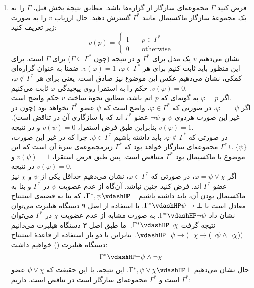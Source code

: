 \begin{ans}
\begin{enumerate}[label=(\alph*)]
        \item 
        فرض کنید $\Gamma$ مجموعه‌ای سازگار از گزاره‌ها باشد. مطابق نتیجهٔ بخش قبل، $\Gamma$ را به یک مجموعهٔ سازگار ماکسیمال مانند $\Gamma^*$ گسترش دهید. حال ارزیاب $v$ را به صورت زیر تعریف کنید:
        $$v(p) =
        \begin{cases}
            1 &\quad p \in \Gamma^*\\
            0 &\quad \text{otherwise}
        \end{cases}
        $$
        نشان می‌دهیم $v$ یک مدل برای $\Gamma^*$ و در نتیجه (چون $\Gamma \subseteq \Gamma^*$) برای $\Gamma$ است. برای این منظور باید ثابت کنیم برای هر $\varphi \in \Gamma^*$، $v(\varphi) = 1$. ضمنا به عنوان گزاره‌ای کمکی، نشان می‌دهیم عکس این موضوع نیز صادق است. یعنی برای هر $\varphi \not\in \Gamma^*$، $v(\varphi) = 0$. حکم را به استقرا روی پیچیدگی $\varphi$ ثابت می‌کنیم.\\
        اگر $\varphi = p$ به گونه‌ای که $p$ اتم باشد، مطابق نحوهٔ ساخت $v$ حکم واضح است.\\
        اگر $\varphi = \neg\psi$، در صورتی که $\varphi \in \Gamma^*$، واضح است که $\psi$ عضو $\Gamma^*$ نخواهد بود (چون در غیر این صورت هردوی $\psi$ و $\neg\psi$ عضو $\Gamma^*$ اند که با سازگاری آن در تناقض است). بنابراین طبق فرض استقرا، $v(\psi) = 0$ و در نتیجه $v(\varphi) = 1$.\\
        در صورتی که $\varphi \not\in \Gamma^*$، باید داشته باشیم $\psi \in \Gamma^*$. چرا که در غیر این صورت، $\Gamma^* \cup \{\psi\}$ مجموعه‌ای سازگار خواهد بود که $\Gamma^*$ زیرمجموعه‌ی سرهٔ آن است که این موضوع با ماکسیمال بود $\Gamma^*$ متناقض است. پس طبق فرض استقرا، $v(\psi) = 1$ و در نتیجه $v(\varphi) = 0$.\\
        اگر $\varphi = \psi \vee \chi$، در صورتی که $\varphi \in \Gamma^*$، نشان می‌دهیم حداقل یکی از $\psi$ و $\chi$ نیز عضو $\Gamma^*$ اند. فرض کنید چنین نباشد. آن‌گاه از عدم عضویت $\psi$ در $\Gamma^*$ و بنا به ماکسیمال بودن آن، باید داشته باشیم $\Gamma^*, \psi \vdashHP \bot$، که بنا به قضیه‌ی استنتاج معادل است با $\Gamma^* \vdashHP \psi\rightarrow\bot$. با استفاده از اصل ۹ دستگاه هیلبرت می‌توان نشان داد $\Gamma^* \vdashHP \neg\psi$. به صورت مشابه از عدم عضویت $\chi$ در $\Gamma^*$ می‌توان نتیجه گرفت $\Gamma^* \vdashHP \neg\chi$.
        اما طبق اصل ۳ دستگاه هیلبرت می‌دانیم ${\vdashHP \neg\psi \rightarrow (\neg\chi \rightarrow (\neg\psi \wedge \neg\chi))}$. بنابراین با دو بار استفاده از قاعدهٔ استنتاج دستگاه هیلبرت () خواهیم داشت:
        $$\Gamma^* \vdashHP \neg\psi \wedge \neg\chi$$
        حال نشان می‌دهیم $\Gamma^*, \psi \vee \chi \vdashHP \bot$. این نتیجه، با این حقیقت که $\psi \vee \chi$ عضو $\Gamma^*$ است و $\Gamma^*$ مجموعه‌ای سازگار است در تناقض است. داریم:

\end{enumerate}
\end{ans}
